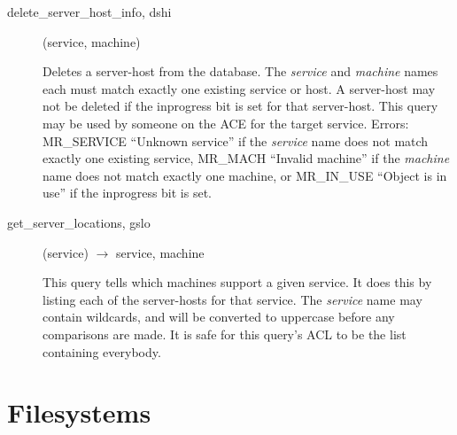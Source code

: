 \documentclass{article}
\begin{document}
\begin{description}
\item[delete\_server\_host\_info, dshi](service, machine)

Deletes a server-host from the database.  The {\em service} and
{\em machine} names each must match exactly one existing service or
host.  A server-host may not be deleted if the inprogress bit is set
for that server-host.  This query may be used by someone on the ACE
for the target service.  Errors: MR\_SERVICE ``Unknown service'' if the
{\em service} name does not match exactly one existing service, MR\_MACH
``Invalid machine'' if the {\em machine} name does not match exactly one
machine, or MR\_IN\_USE ``Object is in use'' if the inprogress bit is
set.

\item[get\_server\_locations, gslo](service) $\rightarrow$ service, machine

This query tells which machines support a given service.  It does this
by listing each of the server-hosts for that service.  The {\em service}
name may contain wildcards, and will be converted to uppercase before
any comparisons are made.  It is safe for this query's ACL to be the
list containing everybody.

\end{description}

\section{Filesystems}
\end{document}
